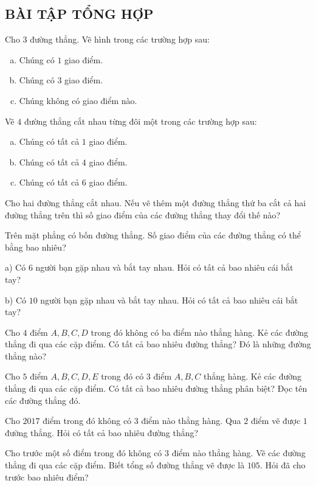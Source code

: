 \begin{bt}
\subsection{BÀI TẬP TỔNG HỢP}
\end{bt}   \begin{bt}
Cho $3$ đường thẳng. Vẽ hình trong các trường hợp sau:
\begin{enumerate}[a)]
\item Chúng có $1$ giao điểm.
\item Chúng có $3$ giao điểm.
\item Chúng không có giao điểm nào.
\end{enumerate}
\end{bt}   \begin{bt}
Vẽ $4$ đường thẳng cắt nhau từng đôi một trong các trường hợp sau:
\begin{enumerate}[a)]
\item	Chúng có tất cả $1$ giao điểm.
\item	Chúng có tất cả $4$ giao điểm.
\item	Chúng có tất cả $6$ giao điểm.
\end{enumerate}
\end{bt}   \begin{bt}
Cho hai đường thẳng cắt nhau. Nếu vẽ thêm một đường thẳng thứ ba cắt cả hai đường thẳng trên thì số giao điểm của các đường thẳng thay đổi thế nào?
\end{bt}   \begin{bt}
Trên mặt phẳng có bốn đường thẳng. Số giao điểm của các đường thẳng có thể bằng bao nhiêu?
\end{bt}   \begin{bt} 
\item a) Có $6$ người bạn gặp nhau và bắt tay nhau. Hỏi có tất cả bao nhiêu cái bắt tay?
\item b) Có $10$ người bạn gặp nhau và bắt tay nhau. Hỏi có tất cả bao nhiêu cái bắt tay?
\end{bt}   \begin{bt}
Cho $4$ điểm $A, B, C, D$ trong đó không có ba điểm nào thẳng hàng. Kẻ các đường thẳng đi qua các cặp điểm. Có tất cả bao nhiêu đường thẳng? Đó là những đường thẳng nào?
\end{bt}   \begin{bt}
Cho $5$ điểm $A, B, C, D, E$ trong đó có $3$ điểm $A, B, C$ thẳng hàng. Kẻ các đường thẳng đi qua các cặp điểm. Có tất cả bao nhiêu đường thẳng phân biệt? Đọc tên các đường thẳng đó.
\end{bt}   \begin{bt}
Cho $2017$ điểm trong đó không có $3$ điểm nào thẳng hàng. Qua $2$ điểm vẽ được $1$ đường thẳng. Hỏi có tất cả bao nhiêu đường thẳng?
\end{bt}   \begin{bt}
Cho trước một số điểm trong đó không có $3$ điểm nào thẳng hàng. Vẽ các đường thẳng đi qua các cặp điểm. Biết tổng số đường thẳng vẽ được là $105$. Hỏi đã cho trước bao nhiêu điểm?
\end{bt} 
